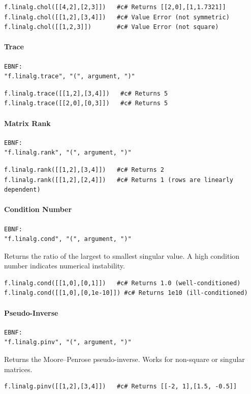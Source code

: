 \begin{verbatim}
f.linalg.chol([[4,2],[2,3]])   #c# Returns [[2,0],[1,1.7321]]
f.linalg.chol([[1,2],[3,4]])   #c# Value Error (not symmetric)
f.linalg.chol([[1,2,3]])       #c# Value Error (not square)
\end{verbatim}

\paragraph{Trace}
\begin{verbatim}
EBNF:
"f.linalg.trace", "(", argument, ")"
\end{verbatim}
\begin{verbatim}
f.linalg.trace([[1,2],[3,4]])   #c# Returns 5
f.linalg.trace([[2,0],[0,3]])   #c# Returns 5
\end{verbatim}

\paragraph{Matrix Rank}
\begin{verbatim}
EBNF:
"f.linalg.rank", "(", argument, ")"
\end{verbatim}
\begin{verbatim}
f.linalg.rank([[1,2],[3,4]])   #c# Returns 2
f.linalg.rank([[1,2],[2,4]])   #c# Returns 1 (rows are linearly dependent)
\end{verbatim}

\paragraph{Condition Number}
\begin{verbatim}
EBNF:
"f.linalg.cond", "(", argument, ")"
\end{verbatim}
Returns the ratio of the largest to smallest singular value. A high condition number indicates numerical instability.
\begin{verbatim}
f.linalg.cond([[1,0],[0,1]])   #c# Returns 1.0 (well-conditioned)
f.linalg.cond([[1,0],[0,1e-10]]) #c# Returns 1e10 (ill-conditioned)
\end{verbatim}

\paragraph{Pseudo-Inverse}
\begin{verbatim}
EBNF:
"f.linalg.pinv", "(", argument, ")"
\end{verbatim}
Returns the Moore--Penrose pseudo-inverse. Works for non-square or singular matrices.
\begin{verbatim}
f.linalg.pinv([[1,2],[3,4]])   #c# Returns [[-2, 1],[1.5, -0.5]]
\end{verbatim}


